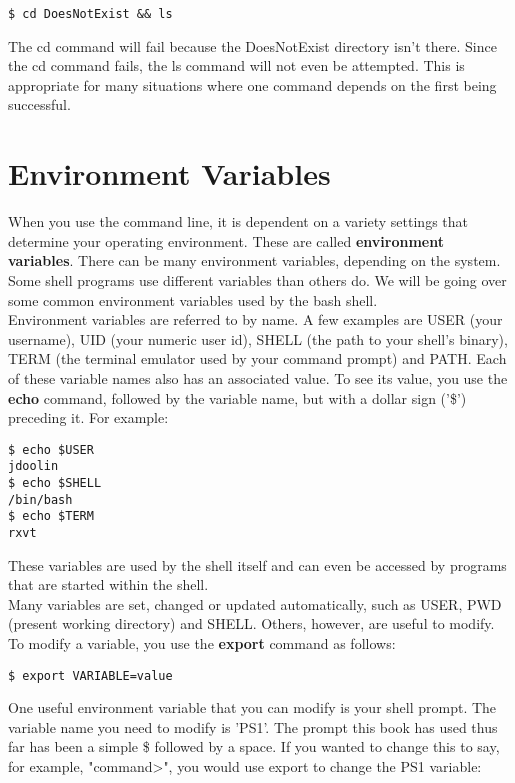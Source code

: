 \begin{verbatim}
$ cd DoesNotExist && ls
\end{verbatim}

The cd command will fail because the DoesNotExist directory isn't there.  Since the cd command fails, the ls command will not even be attempted.  This is appropriate for many situations where one command depends on the first being successful.

\section{Environment Variables}

When you use the command line, it is dependent on a variety settings that determine your operating environment.  These are called \textbf{environment variables}.  There can be many environment variables, depending on the system.  Some shell programs use different variables than others do.  We will be going over some common environment variables used by the bash shell.\\

Environment variables are referred to by name.  A few examples are USER (your username), UID (your numeric user id), SHELL (the path to your shell's binary), TERM (the terminal emulator used by your command prompt) and PATH.  Each of these variable names also has an associated value.  To see its value, you use the \textbf{echo} command, followed by the variable name, but with a dollar sign ('\$') preceding it.  For example:

\begin{verbatim}
$ echo $USER
jdoolin
$ echo $SHELL
/bin/bash
$ echo $TERM
rxvt
\end{verbatim}

These variables are used by the shell itself and can even be accessed by programs that are started within the shell.\\

Many variables are set, changed or updated automatically, such as USER, PWD (present working directory) and SHELL.  Others, however, are useful to modify.  To modify a variable, you use the \textbf{export} command as follows:

\begin{verbatim}
$ export VARIABLE=value
\end{verbatim}

One useful environment variable that you can modify is your shell prompt.  The variable name you need to modify is 'PS1'.  The prompt this book has used thus far has been a simple \$ followed by a space.  If you wanted to change this to say, for example, "command\textgreater ", you would use export to change the PS1 variable:

